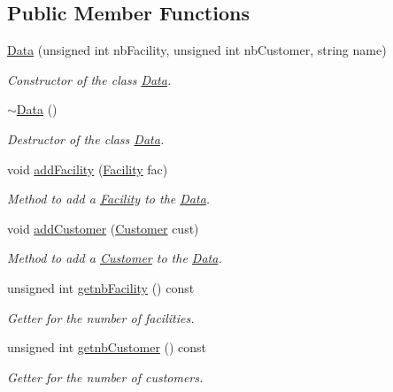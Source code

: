 \subsection*{\-Public \-Member \-Functions}
\begin{DoxyCompactItemize}
\item 
\hyperlink{classData_a6cf5da1a198bf7af9c755f39384aca7b}{\-Data} (unsigned int nb\-Facility, unsigned int nb\-Customer, string name)
\begin{DoxyCompactList}\small\item\em \-Constructor of the class {\ttfamily \hyperlink{classData}{\-Data}}. \end{DoxyCompactList}\item 
\hyperlink{classData_aab31956423290f0d62dcca47ab4d16dd}{$\sim$\-Data} ()
\begin{DoxyCompactList}\small\item\em \-Destructor of the class {\ttfamily \hyperlink{classData}{\-Data}}. \end{DoxyCompactList}\item 
void \hyperlink{classData_ae59b493e34f9d4bfb6e0a56eb47c8098}{add\-Facility} (\hyperlink{classFacility}{\-Facility} fac)
\begin{DoxyCompactList}\small\item\em \-Method to add a {\ttfamily \hyperlink{classFacility}{\-Facility}} to the {\ttfamily \hyperlink{classData}{\-Data}}. \end{DoxyCompactList}\item 
void \hyperlink{classData_a0966083bb17f4b17b9fb82d24d9dfb43}{add\-Customer} (\hyperlink{classCustomer}{\-Customer} cust)
\begin{DoxyCompactList}\small\item\em \-Method to add a {\ttfamily \hyperlink{classCustomer}{\-Customer}} to the {\ttfamily \hyperlink{classData}{\-Data}}. \end{DoxyCompactList}\item 
unsigned int \hyperlink{classData_acd0073711bd2f59fdc5ed5560c761f98}{getnb\-Facility} () const 
\begin{DoxyCompactList}\small\item\em \-Getter for the number of facilities. \end{DoxyCompactList}\item 
unsigned int \hyperlink{classData_ae3f89815592b2ba663324f3ccee61571}{getnb\-Customer} () const 
\begin{DoxyCompactList}\small\item\em \-Getter for the number of customers. \end{DoxyCompactList}\item 

\end{DoxyCompactItemize}
